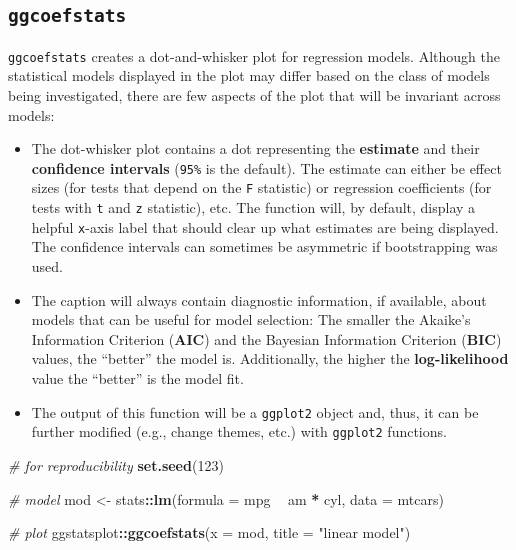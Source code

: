 \documentclass[]{article}
\newenvironment{Shaded}{\begin{snugshade}}{\end{snugshade}}
\newcommand{\CommentTok}[1]{\textcolor[rgb]{0.56,0.35,0.01}{\textit{#1}}}
\newcommand{\DataTypeTok}[1]{\textcolor[rgb]{0.13,0.29,0.53}{#1}}
\newcommand{\DecValTok}[1]{\textcolor[rgb]{0.00,0.00,0.81}{#1}}
\newcommand{\KeywordTok}[1]{\textcolor[rgb]{0.13,0.29,0.53}{\textbf{#1}}}
\newcommand{\NormalTok}[1]{#1}
\newcommand{\OperatorTok}[1]{\textcolor[rgb]{0.81,0.36,0.00}{\textbf{#1}}}
\newcommand{\StringTok}[1]{\textcolor[rgb]{0.31,0.60,0.02}{#1}}
\begin{document}
\hypertarget{ggcoefstats}{%
\subsection{\texorpdfstring{\texttt{ggcoefstats}}{ggcoefstats}}\label{ggcoefstats}}

\texttt{ggcoefstats} creates a dot-and-whisker plot for regression models. Although the
statistical models displayed in the plot may differ based on the class of models
being investigated, there are few aspects of the plot that will be invariant
across models:

\begin{itemize}
\item
  The dot-whisker plot contains a dot representing the \textbf{estimate} and their
  \textbf{confidence intervals} (\texttt{95\%} is the default). The estimate can either be
  effect sizes (for tests that depend on the \texttt{F} statistic) or regression
  coefficients (for tests with \texttt{t} and \texttt{z} statistic), etc. The function will, by
  default, display a helpful \texttt{x}-axis label that should clear up what estimates are
  being displayed. The confidence intervals can sometimes be asymmetric if
  bootstrapping was used.
\item
  The caption will always contain diagnostic information, if available, about
  models that can be useful for model selection: The smaller the Akaike's
  Information Criterion (\textbf{AIC}) and the Bayesian Information Criterion (\textbf{BIC})
  values, the ``better'' the model is. Additionally, the higher the
  \textbf{log-likelihood} value the ``better'' is the model fit.
\item
  The output of this function will be a \texttt{ggplot2} object and, thus, it can be
  further modified (e.g., change themes, etc.) with \texttt{ggplot2} functions.
\end{itemize}

\begin{Shaded}
\begin{Highlighting}[]
\CommentTok{# for reproducibility}
\KeywordTok{set.seed}\NormalTok{(}\DecValTok{123}\NormalTok{)}

\CommentTok{# model}
\NormalTok{mod <-}\StringTok{ }\NormalTok{stats}\OperatorTok{::}\KeywordTok{lm}\NormalTok{(}\DataTypeTok{formula =}\NormalTok{ mpg }\OperatorTok{~}\StringTok{ }\NormalTok{am }\OperatorTok{*}\StringTok{ }\NormalTok{cyl, }\DataTypeTok{data =}\NormalTok{ mtcars)}

\CommentTok{# plot}
\NormalTok{ggstatsplot}\OperatorTok{::}\KeywordTok{ggcoefstats}\NormalTok{(}\DataTypeTok{x =}\NormalTok{ mod, }\DataTypeTok{title =} \StringTok{"linear model"}\NormalTok{)}
\end{Highlighting}
\end{Shaded}
\end{document}
